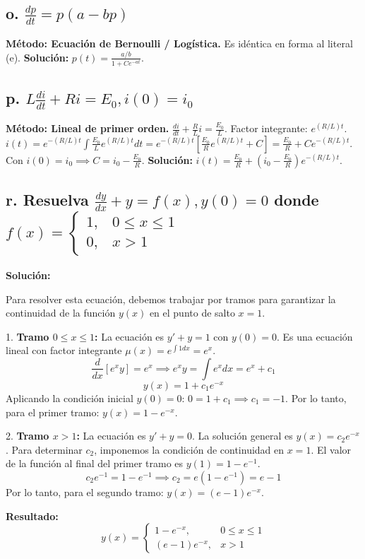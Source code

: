 \documentclass[a4paper]{article}
\begin{document}
\subsection*{o. $\frac{dp}{dt} = p(a - bp)$}
\textbf{Método: Ecuación de Bernoulli / Logística.}
Es idéntica en forma al literal (e).
\textbf{Solución:} $p(t) = \frac{a/b}{1 + Ce^{-at}}$.

\subsection*{p. $L \frac{di}{dt} + Ri = E_0, i(0) = i_0$}
\textbf{Método: Lineal de primer orden.}
$\frac{di}{dt} + \frac{R}{L}i = \frac{E_0}{L}$. Factor integrante: $e^{(R/L)t}$.
$i(t) = e^{-(R/L)t} \int \frac{E_0}{L} e^{(R/L)t} dt = e^{-(R/L)t} [\frac{E_0}{R} e^{(R/L)t} + C] = \frac{E_0}{R} + Ce^{-(R/L)t}$.
Con $i(0) = i_0 \implies C = i_0 - \frac{E_0}{R}$.
\textbf{Solución:} $i(t) = \frac{E_0}{R} + (i_0 - \frac{E_0}{R})e^{-(R/L)t}$.

\subsection*{r. Resuelva $\frac{dy}{dx} + y = f(x), y(0) = 0$ donde $f(x) = \begin{cases} 1, & 0 \le x \le 1 \\ 0, & x > 1 \end{cases}$}

\textbf{Solución:}

Para resolver esta ecuación, debemos trabajar por tramos para garantizar la continuidad de la función $y(x)$ en el punto de salto $x=1$.

1. \textbf{Tramo $0 \le x \le 1$:}
La ecuación es $y' + y = 1$ con $y(0) = 0$. Es una ecuación lineal con factor integrante $\mu(x) = e^{\int 1 dx} = e^x$.
$$\frac{d}{dx}[e^x y] = e^x \implies e^x y = \int e^x dx = e^x + c_1$$
$$y(x) = 1 + c_1 e^{-x}$$
Aplicando la condición inicial $y(0) = 0$: $0 = 1 + c_1 \implies c_1 = -1$.
Por lo tanto, para el primer tramo: $y(x) = 1 - e^{-x}$.

2. \textbf{Tramo $x > 1$:}
La ecuación es $y' + y = 0$. La solución general es $y(x) = c_2 e^{-x}$.
Para determinar $c_2$, imponemos la condición de continuidad en $x=1$. El valor de la función al final del primer tramo es $y(1) = 1 - e^{-1}$.
$$c_2 e^{-1} = 1 - e^{-1} \implies c_2 = e(1 - e^{-1}) = e - 1$$
Por lo tanto, para el segundo tramo: $y(x) = (e - 1)e^{-x}$.

\textbf{Resultado:}
$$y(x) = \begin{cases} 1 - e^{-x}, & 0 \le x \le 1 \\ (e - 1)e^{-x}, & x > 1 \end{cases}$$
\end{document}
